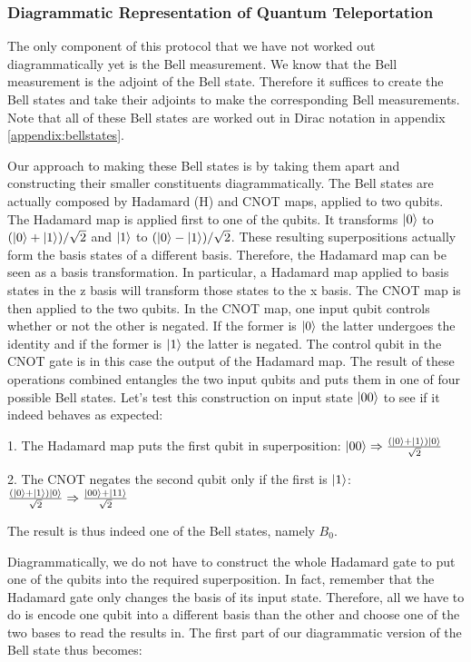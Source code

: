 \documentclass[]{article}
\begin{document}
\subsubsection{Diagrammatic Representation of Quantum Teleportation}

The only component of this protocol that we have not worked out diagrammatically yet is the Bell measurement. We know that the Bell measurement is the adjoint of the Bell state. Therefore it suffices to create the Bell states and take their adjoints to make the corresponding Bell measurements. Note that all of these Bell states are worked out in Dirac notation in appendix \ref{appendix:bellstates}.

Our approach to making these Bell states is by taking them apart and constructing their smaller constituents diagrammatically. The Bell states are actually composed by Hadamard (H) and CNOT maps, applied to two qubits. The Hadamard map is applied first to one of the qubits. It transforms $\ket{0}$ to  $(\ket{0} + \ket{1})/\sqrt{2}$ and $\ket{1}$ to $(\ket{0} - \ket{1})/\sqrt{2}$. These resulting superpositions actually form the basis states of a different basis. Therefore, the Hadamard map can be seen as a basis transformation. In particular, a Hadamard map applied to basis states in the z basis will transform those states to the x basis. The CNOT map is then applied to the two qubits. In the CNOT map, one input qubit controls whether or not the other is negated. If the former is $\ket{0}$ the latter undergoes the identity and if the former is $\ket{1}$ the latter is negated. The control qubit in the CNOT gate is in this case the output of the Hadamard map. The result of these operations combined entangles the two input qubits and puts them in one of four possible Bell states. Let's test this construction on input state $\ket{00}$ to see if it indeed behaves as expected:

1. The Hadamard map puts the first qubit in superposition: $\ket{00} \Rightarrow \frac{(\ket{0} + \ket{1})\ket{0}}{\sqrt{2}}$

2. The CNOT negates the second qubit only if the first is $\ket{1}$: $\frac{(\ket{0} + \ket{1})\ket{0}}{\sqrt{2}} \Rightarrow \frac{\ket{00} + \ket{11}}{\sqrt{2}}$

The result is thus indeed one of the Bell states, namely $B_0$.

Diagrammatically, we do not have to construct the whole Hadamard gate to put one of the qubits into the required superposition. In fact, remember that the Hadamard gate only changes the basis of its input state. Therefore, all we have to do is encode one qubit into a different basis than the other and choose one of the two bases to read the results in. The first part of our diagrammatic version of the Bell state thus becomes:
\end{document}
